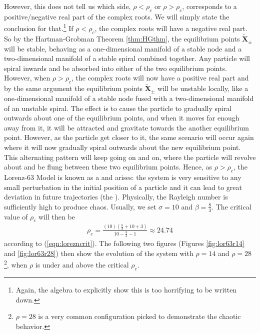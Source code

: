 However, this does not tell us which side, $\rho < \rho_c$ or $\rho > \rho_c$, corresponds to a positive/negative real part of the complex roots. We will simply state the conclusion for that.\footnote{Again, the algebra to explicitly show this is too horrifying to be written down.} If $\rho < \rho_c$, the complex roots will have a negative real part. So by the Hartman-Grobman Theorem \ref{thm:HGthm}, the equilibrium points $\tilde{\textbf{X}}_{\pm}$ will be stable, behaving as a one-dimensional manifold of a stable node and a two-dimensional manifold of a stable spiral combined together. Any particle will spiral inwards and be absorbed into either of the two equilibrium points. However, when $\rho > \rho_c$, the complex roots will now have a positive real part and by the same argument the equilibrium points $\tilde{\textbf{X}}_{\pm}$ will be unstable locally, like a one-dimensional manifold of a stable node fused with a two-dimensional manifold of an unstable spiral. The effect is to cause the particle to gradually spiral outwards about one of the equilibrium points, and when it moves far enough away from it, it will be attracted and gravitate towards the another equilibrium point. However, as the particle get closer to it, the same scenario will occur again where it will now gradually spiral outwards about the new equilibrium point. This alternating pattern will keep going on and on, where the particle will revolve about and be flung between these two equilibrium points. Hence, as $\rho > \rho_c$, the Lorenz-63 Model is known as a  and  arises: the system is very sensitive to any small perturbation in the initial position of a particle and it can lead to great deviation in future trajectories (the ). Physically, the Rayleigh number is sufficiently high to produce chaos. Usually, we set $\sigma = 10$ and $\beta = \frac{8}{3}$. The critical value of $\rho_c$ will then be
\begin{align*}
\rho_c = \frac{(10)(\frac{8}{3} + 10 + 3)}{10 - \frac{8}{3} - 1} \approx 24.74
\end{align*}
according to (\ref{eqn:lorezncrit}). The following two figures (Figures \ref{fig:lor63r14} and \ref{fig:lor63r28}) then show the evolution of the system with $\rho = 14$ and $\rho = 28$\footnote{$\rho = 28$ is a very common configuration picked to demonstrate the chaotic behavior.}, when $\rho$ is under and above the critical $\rho_c$.
